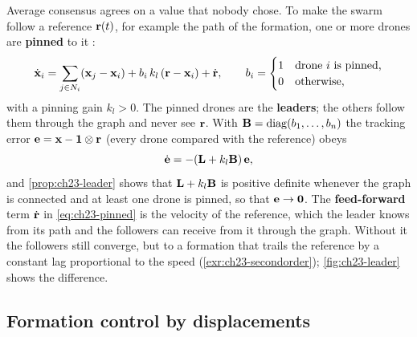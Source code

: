 Average consensus agrees on a value that nobody chose. To make the swarm
follow a reference $\mathbf{r}(t)$, for example the \cbs path of the formation,
one or more drones are \textbf{pinned}
to it \cite{ren2008distributed}:
\begin{equation}
  \dot{\mathbf{x}}_i = \sum_{j \in N_i} (\mathbf{x}_j - \mathbf{x}_i)
  + b_i\, k_l\, (\mathbf{r} - \mathbf{x}_i) + \dot{\mathbf{r}}, \qquad
  b_i = \begin{cases} 1 & \text{drone $i$ is pinned,}\\ 0 & \text{otherwise,} \end{cases}
  \label{eq:ch23-pinned}
\end{equation}
with a pinning gain $k_l > 0$. The pinned drones are the
\textbf{leaders}; the others follow them through the
graph and never see $\mathbf{r}$. With $\mathbf{B} = \operatorname{diag}(b_1, \dots, b_n)$ the
tracking error $\mathbf{e} = \mathbf{x} - \mathbf{1}\otimes\mathbf{r}$ (every drone
compared with the reference) obeys
\begin{equation}
  \dot{\mathbf{e}} = -(\mathbf{L} + k_l \mathbf{B})\,\mathbf{e},
  \label{eq:ch23-pinnedmatrix}
\end{equation}
and \cref{prop:ch23-leader} shows that $\mathbf{L} + k_l\mathbf{B}$ is positive
definite whenever the graph is connected and at least one drone is pinned, so
that $\mathbf{e} \to \mathbf{0}$. The \textbf{feed-forward}
term $\dot{\mathbf{r}}$ in \cref{eq:ch23-pinned} is the velocity of the reference,
which the leader knows from its path and the followers can receive from it
through the graph. Without it the followers still converge, but to a
formation that trails the reference by a constant lag proportional to the speed
(\cref{exr:ch23-secondorder}); \cref{fig:ch23-leader} shows the difference.

\subsection{Formation control by displacements}
\label{sec:ch23-formation}

